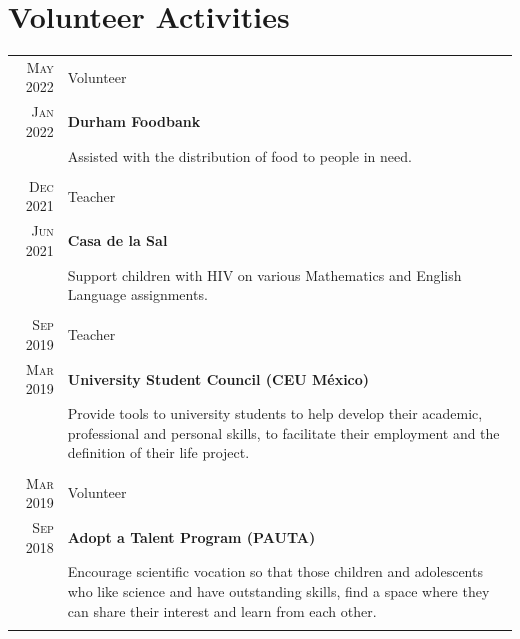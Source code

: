 \documentclass[a4paper,10pt]{article} %
\begin{document}
\section{Volunteer Activities}
\bigskip
\begin{tabular}{r|p{11cm}}

	\textsc{May 2022} & Volunteer\\
	\textsc{Jan 2022} &\footnotesize{\textbf{Durham Foodbank}}\\
	&\footnotesize{Assisted with the distribution of food to people in need.}\\
	\multicolumn{2}{c}{} \\	


	\textsc{Dec 2021} & Teacher\\
	\textsc{Jun 2021} &\footnotesize{\textbf{Casa de la Sal}}\\
	&\footnotesize{Support children with HIV on various Mathematics and English Language assignments.}\\
	\multicolumn{2}{c}{} \\	

	
	\textsc{Sep 2019} & Teacher\\
	\textsc{Mar 2019} &\footnotesize{\textbf{University Student Council (CEU México)}}\\
	&\footnotesize{Provide tools to university students to help develop their academic, professional and personal skills, to facilitate their employment and the definition of their life project.}\\
	\multicolumn{2}{c}{} \\	
	

	\textsc{Mar 2019} & Volunteer\\
	\textsc{Sep 2018} &\footnotesize{\textbf{Adopt a Talent Program (PAUTA)}}\\
	&\footnotesize{Encourage scientific vocation so that those children and adolescents who like science and have outstanding skills, find a space where they can share their interest and learn from each other.}\\
	\multicolumn{2}{c}{} \\	
	

\end{tabular}
\end{document}
